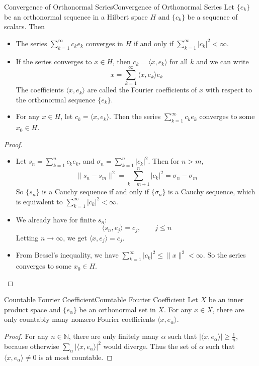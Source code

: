 \documentclass[../main.tex]{subfiles}
\begin{document}
\begin{theorem}{Convergence of Orthonormal Series}{Convergence of Orthonormal Series}
	Let $\{e_k\}$ be an orthonormal sequence in a Hilbert space $H$ and $\{c_k\}$ be a sequence of scalars. Then
	\begin{itemize}
		\item The series $\sum_{k=1}^\infty c_k e_k$ converges in $H$ if and only if $\sum_{k=1}^\infty |c_k|^2 < \infty$.
		\item If the series converges to $x\in H$, then $c_k = \langle x, e_k \rangle$ for all $k$ and we can write
			\begin{equation*}
				x = \sum_{k=1}^\infty \langle x, e_k \rangle e_k
			\end{equation*}
			The coefficients $\langle x, e_k \rangle$ are called the Fourier coefficients of $x$ with respect to the orthonormal sequence $\{e_k\}$.
		\item For any $x\in H$, let $c_k = \langle x, e_k \rangle$. Then the series $\sum_{k=1}^\infty c_k e_k$ converges to some $x_0 \in H$.
	\end{itemize}
\end{theorem}
\begin{proof}
\begin{itemize}
	\item Let $s_n = \sum_{k=1}^n c_k e_k$, and $\sigma_n = \sum_{k=1}^n |c_k|^2$. Then for $n>m$,
		\begin{equation*}
			\|s_n - s_m\|^2 = \sum_{k=m+1}^n |c_k|^2 = \sigma_n - \sigma_m
		\end{equation*}
		So $\{s_n\}$ is a Cauchy sequence if and only if $\{\sigma_n\}$ is a Cauchy sequence, which is equivalent to $\sum_{k=1}^\infty |c_k|^2 < \infty$.
	\item We already have for finite $s_n$:
		\begin{equation*}
			\langle s_n, e_j \rangle = c_j, \qquad j \leq n
		\end{equation*}
		Letting $n \to \infty$, we get $\langle x, e_j \rangle = c_j$.
	\item From Bessel's inequality, we have $\sum_{k=1}^\infty |c_k|^2 \leq \|x\|^2 < \infty$. So the series converges to some $x_0 \in H$.
\end{itemize}
\end{proof}

\begin{lemma}{Countable Fourier Coefficient}{Countable Fourier Coefficient}
	Let $X$ be an inner product space and $\{e_{\alpha}\}$ be an orthonormal set in $X$. For any $x\in X$, there are only countably many nonzero Fourier coefficients $\langle x, e_{\alpha} \rangle$.
\end{lemma}
\begin{proof}
	For any $n\in \mathbb{N}$, there are only finitely many $\alpha$ such that $|\langle x, e_{\alpha} \rangle| \geq \frac{1}{n}$, because otherwise $\sum_{\alpha} |\langle x, e_{\alpha} \rangle|^2$ would diverge. Thus the set of $\alpha$ such that $\langle x, e_{\alpha} \rangle \neq 0$ is at most countable.
\end{proof}
\end{document}
